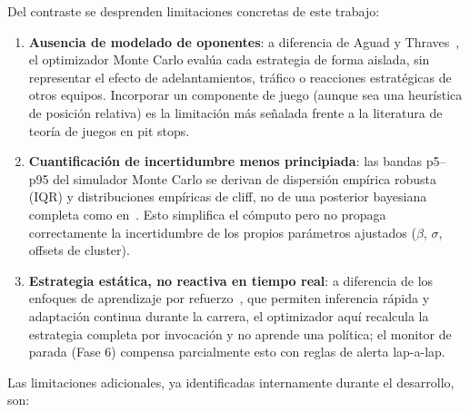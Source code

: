 \documentclass[conference]{IEEEtran}
\begin{document}
Del contraste se desprenden limitaciones concretas de este trabajo:

\begin{enumerate}
  \item \textbf{Ausencia de modelado de oponentes}: a diferencia de
        Aguad y Thraves~\cite{aguad2024}, el optimizador Monte Carlo evalúa
        cada estrategia de forma aislada, sin representar el efecto de
        adelantamientos, tráfico o reacciones estratégicas de otros
        equipos. Incorporar un componente de juego (aunque sea una
        heurística de posición relativa) es la limitación más señalada
        frente a la literatura de teoría de juegos en pit stops.
  \item \textbf{Cuantificación de incertidumbre menos principiada}: las
        bandas p5–p95 del simulador Monte Carlo se derivan de dispersión
        empírica robusta (IQR) y distribuciones empíricas de cliff, no de
        una posterior bayesiana completa como en~\cite{cappello2025tire}.
        Esto simplifica el cómputo pero no propaga correctamente la
        incertidumbre de los propios parámetros ajustados ($\beta$,
        $\sigma$, offsets de cluster).
  \item \textbf{Estrategia estática, no reactiva en tiempo real}: a
        diferencia de los enfoques de aprendizaje por
        refuerzo~\cite{neumann2025learning,thomas2025rl}, que permiten
        inferencia rápida y adaptación continua durante la carrera, el
        optimizador aquí recalcula la estrategia completa por invocación
        y no aprende una política; el monitor de parada (Fase 6) compensa
        parcialmente esto con reglas de alerta lap-a-lap.
\end{enumerate}

Las limitaciones adicionales, ya identificadas internamente durante el
desarrollo, son:
\end{document}

